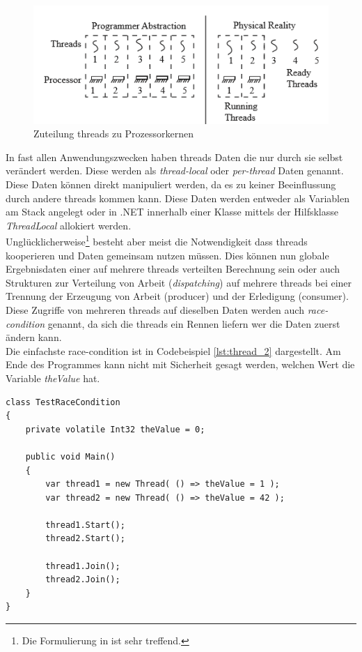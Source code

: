 \begin{figure}
	\centering
	\includegraphics[width=0.7\linewidth]{images/threads_cores.png}
	\caption{Zuteilung threads zu Prozessorkernen\parencite[S. 140]{Dahlin2012}}
	\label{fig:threads_cores}
\end{figure}

In fast allen Anwendungszwecken haben threads Daten die nur durch sie selbst verändert werden. Diese werden als \emph{thread-local} oder \emph{per-thread} Daten genannt. Diese Daten können direkt manipuliert werden, da es zu keiner Beeinflussung durch andere threads kommen kann. Diese Daten werden entweder als Variablen am Stack angelegt oder in .NET innerhalb einer Klasse mittels der Hilfsklasse \textit{ThreadLocal} allokiert werden\parencite{ms_threadlocal}. 
\\Unglücklicherweise\footnote{Die Formulierung in \parencite[S. 179]{Dahlin2012} ist sehr treffend.} besteht aber meist die Notwendigkeit dass threads kooperieren und Daten gemeinsam nutzen müssen. Dies können nun globale Ergebnisdaten einer auf mehrere threads verteilten Berechnung sein oder auch Strukturen zur Verteilung von Arbeit (\textit{dispatching}) auf mehrere threads bei einer Trennung der Erzeugung von Arbeit (producer) und der Erledigung (consumer). Diese Zugriffe von mehreren threads auf dieselben Daten werden auch \emph{race-condition} genannt, da sich die threads ein Rennen liefern wer die Daten zuerst ändern kann.
\\Die einfachste race-condition ist in Codebeispiel \ref{lst:thread_2} dargestellt\parencite[S. 182]{Dahlin2012}. Am Ende des Programmes kann nicht mit Sicherheit gesagt werden, welchen Wert die Variable \textit{theValue} hat.

\begin{lstlisting}[caption={Thread race-condition},label={lst:thread_2},captionpos=b]
class TestRaceCondition
{
	private volatile Int32 theValue = 0;
	
	public void Main()
	{
        var thread1 = new Thread( () => theValue = 1 );
		var thread2 = new Thread( () => theValue = 42 );

		thread1.Start();
		thread2.Start();

		thread1.Join();
		thread2.Join();
	}
}
\end{lstlisting}


